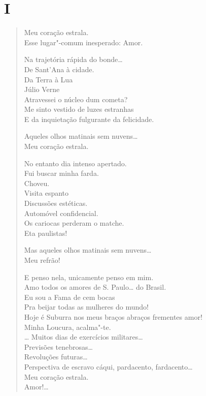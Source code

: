 \chapter[\textsc{i}\ \ \ \ ``Meu coração estrala'']{I}

\begin{verse}
Meu coração estrala.\\
Esse lugar"-comum inesperado: Amor.

\quad\quad\quad{}Na trajetória rápida do bonde\ldots{}\\
\quad\quad\quad\quad{}De Sant'Ana à cidade.\\
\quad\quad\quad\quad\quad{}Da Terra à Lua\\
\quad\quad\quad\quad\quad\quad{}Júlio Verne\\
\quad\quad\quad\quad\quad{}Atravessei o núcleo dum cometa?\\
\quad\quad\quad\quad{}Me sinto vestido de luzes estranhas\\
\quad\quad\quad\quad{}E da inquietação fulgurante da felicidade.

Aqueles olhos matinais sem nuvens\ldots{}\\
Meu coração estrala.

No entanto dia intenso apertado.\\
\quad\quad\quad\quad{}Fui buscar minha farda.\\
\quad\quad\quad\quad{}Choveu.\\
\quad\quad\quad\quad{}Visita espanto\\
\quad\quad\quad\quad{}Discussões estéticas.\\
\quad\quad\quad\quad{}Automóvel confidencial.\\
\quad\quad\quad\quad{}Os cariocas perderam o matche.\\
\quad\quad\quad\quad{}Eta paulistas!

Mas aqueles olhos matinais sem nuvens\ldots{}\\
Meu refrão!

E penso nela, unicamente penso em mim.\\
Amo todos os amores de S. Paulo\ldots{} do Brasil.\\
Eu sou a Fama de cem bocas\\
Pra beijar todas as mulheres do mundo!\\
Hoje é Suburra nos meus braços abraços frementes amor!\\
Minha Loucura, acalma"-te.\\
\ldots{} Muitos dias de exercícios militares\ldots{}\\
\quad\quad\quad\quad{}Previsões tenebrosas\ldots{}\\
\quad\quad\quad\quad\quad\quad{}Revoluções futuras\ldots{}\\
Perspectiva de escravo cáqui, pardacento, fardacento\ldots{}\\

Meu coração estrala.\\
Amor!\ldots{}
\end{verse}


